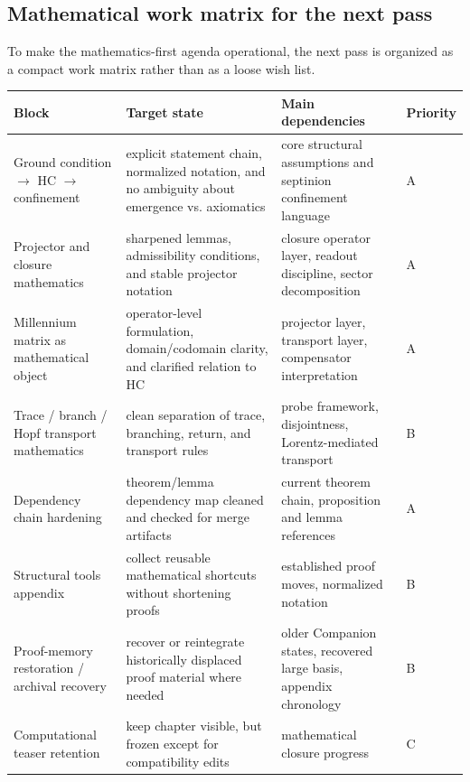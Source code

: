 \subsection*{Mathematical work matrix for the next pass}
To make the mathematics-first agenda operational, the next pass is organized as a compact work matrix rather than as a loose wish list.
\begin{center}
{\scriptsize\setlength{\tabcolsep}{2pt}\begin{tabular}{@{}p{}p{}p{}p{}@{}}
\toprule
\textbf{Block} & \textbf{Target state} & \textbf{Main dependencies} & \textbf{Priority}\\
\midrule
Ground condition $\to$ HC $\to$ confinement & explicit statement chain, normalized notation, and no ambiguity about emergence vs. axiomatics & core structural assumptions and septinion confinement language & A\\
Projector and closure mathematics & sharpened lemmas, admissibility conditions, and stable projector notation & closure operator layer, readout discipline, sector decomposition & A\\
Millennium matrix as mathematical object & operator-level formulation, domain/codomain clarity, and clarified relation to HC & projector layer, transport layer, compensator interpretation & A\\
Trace / branch / Hopf transport mathematics & clean separation of trace, branching, return, and transport rules & probe framework, disjointness, Lorentz-mediated transport & B\\
Dependency chain hardening & theorem/lemma dependency map cleaned and checked for merge artifacts & current theorem chain, proposition and lemma references & A\\
Structural tools appendix & collect reusable mathematical shortcuts without shortening proofs & established proof moves, normalized notation & B\\
Proof-memory restoration / archival recovery & recover or reintegrate historically displaced proof material where needed & older Companion states, recovered large basis, appendix chronology & B\\
Computational teaser retention & keep chapter visible, but frozen except for compatibility edits & mathematical closure progress & C\\
\bottomrule
\end{tabular}}
\end{center}


